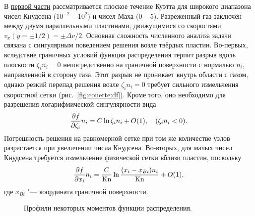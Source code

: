 В \underline{первой части} рассматривается плоское течение Куэтта для широкого диапазона
чисел Кнудсена (\(10^{-2}\) -- \(10^2\)) и чисел Маха (0 -- 5).
Разреженный газ заключён между двумя параллельными пластинами, движущимися со скоростями \(v_x(y=\pm1/2)=\pm\Delta{v}/2\).
Основная сложность численного анализа задачи связана с сингулярным поведением решения возле твёрдых пластин.
Во-первых, вследствие граничных условий функция распределения терпит разрыв вдоль плоскости \(\zeta_in_i=0\)
непосредственно на граничной поверхности с нормалью \(n_i\), направленной в сторону газа.
Этот разрыв не проникает внутрь области с газом, однако резкий перепад решения возле \(\zeta_in_i=0\)
требует сильного измельчения скоростной сетки (рис.~\ref{fig:couette:df}).
Кроме того, оно необходимо для разрешения логарифмической сингулярности вида~\autocite{Takata2016}
\begin{equation*}
    \pder[f]{\zeta_i}n_i = C\ln\zeta_in_i + \OO{1}, \quad (\zeta_in_i<0).
\end{equation*}
Погрешность решения на равномерной сетке при том же количестве узлов
разрастается при увеличении числа Кнудсена.
Во-вторых, для малых чисел Кнудсена требуется измельчение физической сетки вблизи пластин, поскольку~\autocite{Takata2014}
\begin{equation*}
    \pder[f]{x_i}n_i = \frac{C}{\Kn}\ln\frac{(x_i-x_{Bi})n_i}{\Kn} + \OO{1},
\end{equation*}
где \(x_{Bi}\) "--- координата граничной поверхности.

\begin{figure}
    \centering
    \caption{Профили некоторых моментов функции распределения.}
    \label{fig:couette:profiles}
\end{figure}


